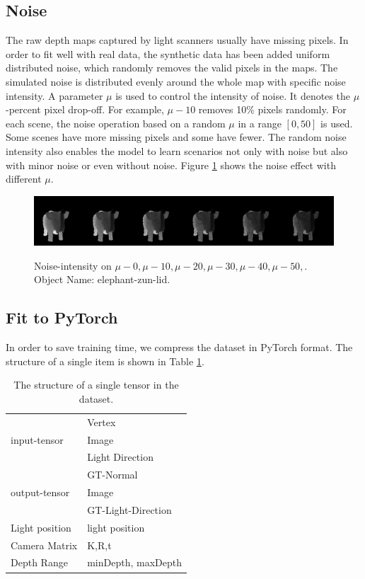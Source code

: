 \subsection{Noise}
\label{sec:noise}
The raw depth maps captured by light scanners usually have missing pixels. In order to fit well with real data, the synthetic data has been added uniform distributed noise, which randomly removes the valid pixels in the maps.
The simulated noise is distributed evenly around the whole map with specific noise intensity. A parameter $ \mu $ is used to control the intensity of noise. It denotes the $ \mu $-percent pixel drop-off. For example, $ \mu-10 $ removes 10\% pixels randomly. For each scene, the noise operation based on a random $ \mu $ in a range $ \left[0, 50\right]  $ is used. Some scenes have more missing pixels and some have fewer. The random noise intensity also enables the model to learn scenarios not only with noise but also with minor noise or even without noise.
Figure \ref{fig:noise-intensity} shows the noise effect with different $ \mu $.
\begin{figure}[!h]
	\centering
	{\includegraphics[width=.9\textwidth]{./Figures/add_noise_depth.png}}
	\decoRule
	\caption{Noise-intensity on $ \mu-0, \mu-10,\mu-20, \mu-30, \mu-40, \mu-50,$. Object Name: elephant-zun-lid.}
	\label{fig:noise-intensity}
\end{figure}


\subsection{Fit to PyTorch}
In order to save training time, we compress the dataset in PyTorch format. The structure of a single item is shown in Table \ref{tab:tensor-structure}.
\begin{table}[H]
	\caption{The structure of a single tensor in the dataset.}
	\label{tab:tensor-structure}
	\centering
	\begin{tabular}{l | l}
		\toprule
		\tabhead{Name} & \tabhead{Content} \\
		\midrule
		\multirow{3}{*}{input-tensor}  & Vertex \\  & Image \\  & Light Direction \\
		\hline
		\multirow{3}{*}{output-tensor}  & GT-Normal \\ & Image \\ & GT-Light-Direction \\
		\hline
		Light position & light position \\
		\hline 
		Camera Matrix  & K,R,t\\
		\hline 
		Depth Range  & minDepth, maxDepth\\
		\bottomrule
	\end{tabular}
\end{table}

